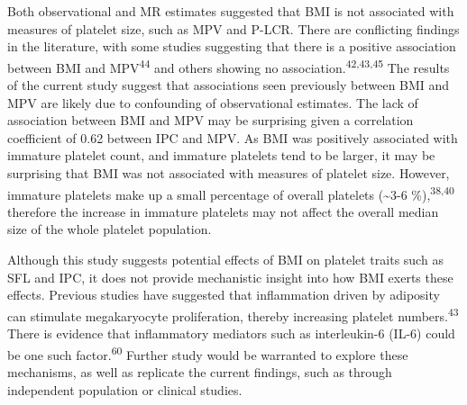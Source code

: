 \documentclass[11pt,twoside]{bristolthesis}
\begin{document}
Both observational and MR estimates suggested that BMI is not associated with measures of platelet size, such as MPV and P-LCR. There are conflicting findings in the literature, with some studies suggesting that there is a positive association between BMI and MPV\textsuperscript{44} and others showing no association.\textsuperscript{42,43,45} The results of the current study suggest that associations seen previously between BMI and MPV are likely due to confounding of observational estimates. The lack of association between BMI and MPV may be surprising given a correlation coefficient of 0.62 between IPC and MPV. As BMI was positively associated with immature platelet count, and immature platelets tend to be larger, it may be surprising that BMI was not associated with measures of platelet size. However, immature platelets make up a small percentage of overall platelets (\textasciitilde3-6 \%),\textsuperscript{38,40} therefore the increase in immature platelets may not affect the overall median size of the whole platelet population.

Although this study suggests potential effects of BMI on platelet traits such as SFL and IPC, it does not provide mechanistic insight into how BMI exerts these effects. Previous studies have suggested that inflammation driven by adiposity can stimulate megakaryocyte proliferation, thereby increasing platelet numbers.\textsuperscript{43} There is evidence that inflammatory mediators such as interleukin-6 (IL-6) could be one such factor.\textsuperscript{60} Further study would be warranted to explore these mechanisms, as well as replicate the current findings, such as through independent population or clinical studies.
\end{document}
